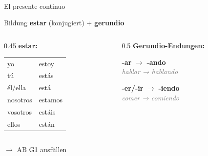 \documentclass[aspectratio=169, 14pt]{beamer}
\newcommand{\es}[1]{\textbf{#1}}
\newcommand{\de}[1]{\textit{\textcolor{gray}{#1}}}
\newcommand{\abmark}[1]{\textcolor{spanisch}{$\rightarrow$ AB #1}}
\begin{document}
\begin{frame}{El presente continuo}

\begin{block}{Bildung}
\centering
\Large
\es{estar} (konjugiert) + \es{gerundio}
\end{block}

\vspace{1em}

\begin{columns}
\begin{column}{0.45\textwidth}
\textbf{estar:}
\begin{tabular}{ll}
yo & estoy \\
tú & estás \\
él/ella & está \\
nosotros & estamos \\
vosotros & estáis \\
ellos & están \\
\end{tabular}
\end{column}

\begin{column}{0.5\textwidth}
\textbf{Gerundio-Endungen:}

\vspace{0.5em}

\es{-ar} $\rightarrow$ \es{-ando}\\
\de{hablar → hablando}

\vspace{0.5em}

\es{-er/-ir} $\rightarrow$ \es{-iendo}\\
\de{comer → comiendo}
\end{column}
\end{columns}

\vspace{1em}
\abmark{G1 ausfüllen}

\end{frame}
\end{document}
